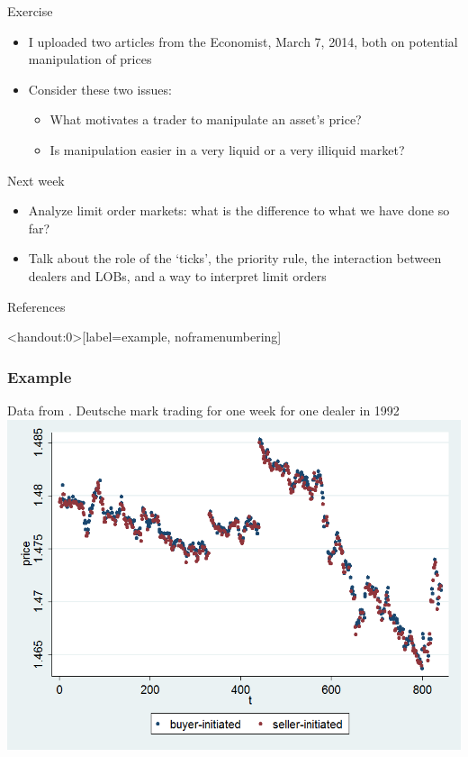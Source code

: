 \documentclass[english,10pt]{beamer}
\begin{document}
\begin{frame}{Exercise}
\begin{itemize}
	\item I uploaded two articles from the Economist, March 7, 2014, both on potential manipulation of prices
	\item Consider these two issues:
	\begin{itemize}
		\item What motivates a trader to manipulate an asset's price? 
		\item Is manipulation easier in a very liquid or a very illiquid market?
	\end{itemize}
\end{itemize}
\end{frame}


\begin{frame}{Next week}
\begin{itemize}
	\item Analyze limit order markets: what is the difference to what we have done so far?
	\item Talk about the role of the `ticks', the priority rule, the interaction between dealers and LOBs, and a way to interpret limit orders
\end{itemize}
\end{frame}




\appendix
\begin{frame}[allowframebreaks]{References}


\end{frame}


\begin{frame}<handout:0>[label=example, noframenumbering]
\frametitle{Example}
Data from \cite{lyons_tests_1995}. Deutsche mark trading for one week for one dealer in 1992
\center
\includegraphics[scale=0.3]{pics/trading}
\end{frame}
\end{document}
